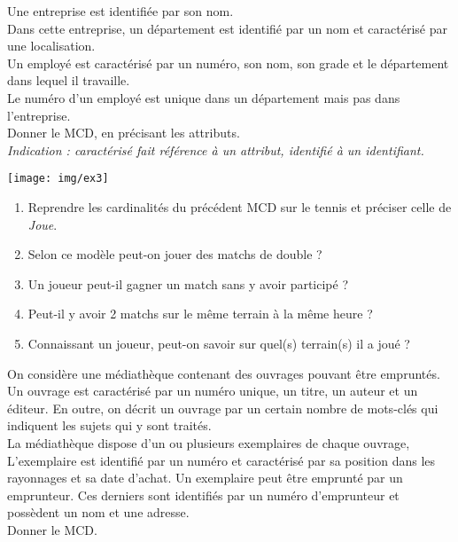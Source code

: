 \documentclass[a4paper,12pt,french]{book}
\begin{document}
\begin{exercice}[]
Une entreprise est identifiée par son nom.\\
Dans cette entreprise, un département est identifié par un nom et caractérisé par une localisation.\\
Un employé est caractérisé par un numéro, son nom, son grade et le département dans lequel il travaille.\\
Le numéro d’un employé est unique dans un département mais pas dans l’entreprise.\\
Donner le MCD, en précisant les attributs.\\

\textit{Indication : \og caractérisé\fg{} fait référence à un attribut, \og identifié\fg{} à un identifiant.}
\end{exercice}

\begin{exercice}[]
\begin{center}
\texttt{[image: img/ex3]}
\end{center}
\begin{enumerate}[\bfseries 1.]
	\item 	Reprendre les cardinalités du précédent MCD sur le tennis et préciser celle de \textit{Joue}.
	\item 	Selon ce modèle peut-on jouer des matchs de double ?
    \item 	Un joueur peut-il gagner un match sans y avoir participé ?
    \item 	Peut-il y avoir 2 matchs sur le même terrain à la même heure ?
    \item 	Connaissant un joueur, peut-on savoir sur quel(s) terrain(s) il a joué ?
\end{enumerate}
\end{exercice}

\begin{exercice}[]
On considère une médiathèque contenant des ouvrages pouvant être empruntés.\\
Un ouvrage est caractérisé par un numéro unique, un titre, un auteur et un éditeur. En outre, on décrit un ouvrage par un certain nombre de mots-clés qui indiquent les sujets qui y sont traités.\\
La médiathèque dispose d’un ou plusieurs exemplaires de chaque ouvrage, L’exemplaire est identifié par un numéro et caractérisé par sa position dans les rayonnages et sa date d’achat.
Un exemplaire peut être emprunté par un emprunteur. Ces derniers sont identifiés par un numéro d’emprunteur et possèdent un nom et une adresse.\\

Donner le MCD.
\end{exercice}
\end{document}
